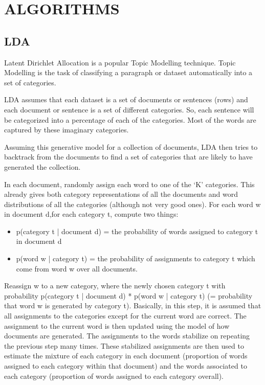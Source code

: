 \documentclass[preprint,12pt]{elsarticle}
\begin{document}
\section{ALGORITHMS }

\subsection{LDA}
Latent Dirichlet Allocation \cite{lda} is a popular Topic Modelling technique. Topic Modelling is the task of classifying a paragraph or dataset automatically into a set of categories.

LDA assumes that each dataset is a set of documents or sentences (rows) and each document or sentence is a set of different categories. So, each sentence will be categorized into a percentage of each of the categories. Most of the words are captured by these imaginary categories.

Assuming this generative model for a collection of documents, LDA then tries to backtrack from the documents to find a set of categories that are likely to have generated the collection.

In each document, randomly assign each word to one of the ‘K’  categories. This already gives both category representations of all the documents and word distributions of all the categories (although not very good ones).
For each word w in document d,for each category t, compute two things: 
\begin{itemize}
\item    p(category t | document d) = the probability of words assigned to category t in document d 
\item   p(word w | category t) = the probability of assignments to category t which come from word w over all documents.
\end{itemize}
Reassign w to a new category, where the newly chosen category t with probability p(category t | document d) * p(word w | category t) (= probability that word w is generated by category t). Basically, in this step, it is assumed that all assignments to the categories except for the current word are correct. The assignment to the current word is then updated using the model of how documents are generated. The assignments to the words stabilize on repeating the previous step many times. These stabilized assignments are then used to estimate the mixture of each category in each document (proportion of words assigned to each category within that document) and the words associated to each category (proportion of words assigned to each category overall).
\end{document}
